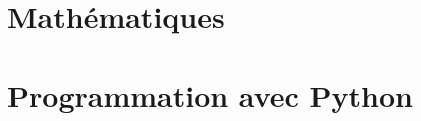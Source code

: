 \documentclass[10pt,a4paper,cours,firamath]{nsi}
\begin{document}

\part{Mathématiques}










\part{Programmation avec Python}








\tableofcontents
\end{document}
